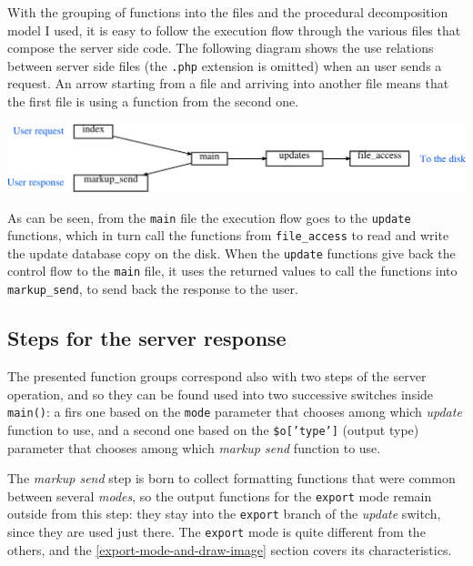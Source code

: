 \documentclass[10pt,a4paper,english]{book}
\begin{document}
With the grouping of functions into the files and the procedural
decomposition model I used, it is easy to follow the execution flow
through the various files that compose the server side code. The
following diagram shows the use relations between server side files
(the \texttt{.php} extension is omitted) when an user sends a request. An
arrow starting from a file and arriving into another file means that
the first file is using a function from the second one.

\includegraphics{images/server_file_use_simplified.png}

As can be seen, from the \texttt{main} file the execution flow goes to the
\texttt{update} functions, which in turn call the functions from
\texttt{file{\_}access} to read and write the update database copy on the
disk. When the \texttt{update} functions give back the control flow to the
\texttt{main} file, it uses the returned values to call the functions into
\texttt{markup{\_}send}, to send back the response to the user.



\hypertarget{steps-for-the-server-response}{}
\subsection{Steps for the server response}
\label{steps-for-the-server-response}

The presented function groups correspond also with two steps of the
server operation, and so they can be found used into two successive
switches inside \texttt{main()}: a firs one based on the \texttt{mode} parameter
that chooses among which \emph{update} function to use, and a second one
based on the \texttt{{\$}o{[}'type'{]}} (output type) parameter that chooses among
which \emph{markup send} function to use\footnotemark[2].

The \emph{markup send} step is born to collect formatting functions that
were common between several \emph{modes}, so the output functions for the
\texttt{export} mode remain outside from this step: they stay into the
\texttt{export} branch of the \emph{update} switch, since they are used just
there. The \texttt{export} mode is quite different from the others, and the
\href{\#export-mode-and-draw-image}{\ref*{export-mode-and-draw-image}} section covers its characteristics.
\end{document}
